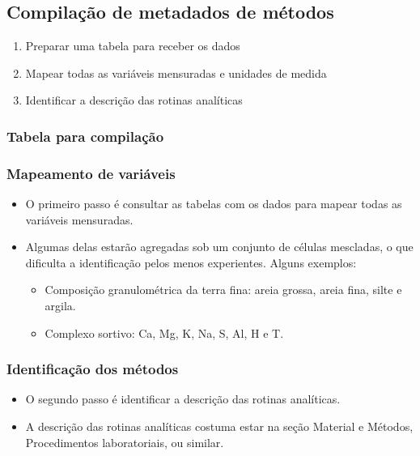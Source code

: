 \documentclass[a4paper,dvipsnames]{tufte-book}
\providecommand{\tightlist}{%
  \setlength{\itemsep}{0pt}\setlength{\parskip}{0pt}}
\begin{document}
\subsection{Compilação de metadados de
métodos}\label{compilauxe7uxe3o-de-metadados-de-muxe9todos}

\begin{enumerate}
\def\labelenumi{\arabic{enumi}.}
\tightlist
\item
  Preparar uma tabela para receber os dados
\item
  Mapear todas as variáveis mensuradas e unidades de medida
\item
  Identificar a descrição das rotinas analíticas
\end{enumerate}

\subsubsection{Tabela para
compilação}\label{tabela-para-compilauxe7uxe3o}

\subsubsection{Mapeamento de
variáveis}\label{mapeamento-de-variuxe1veis}

\begin{itemize}
\tightlist
\item
  O primeiro passo é consultar as tabelas com os dados para mapear todas
  as variáveis mensuradas.
\item
  Algumas delas estarão agregadas sob um conjunto de células mescladas,
  o que dificulta a identificação pelos menos experientes. Alguns
  exemplos:

  \begin{itemize}
  \tightlist
  \item
    Composição granulométrica da terra fina: areia grossa, areia fina,
    silte e argila.
  \item
    Complexo sortivo: Ca, Mg, K, Na, S, Al, H e T.
  \end{itemize}
\end{itemize}

\subsubsection{Identificação dos
métodos}\label{identificauxe7uxe3o-dos-muxe9todos}

\begin{itemize}
\tightlist
\item
  O segundo passo é identificar a descrição das rotinas analíticas.
\item
  A descrição das rotinas analíticas costuma estar na seção Material e
  Métodos, Procedimentos laboratoriais, ou similar.
\end{itemize}
\end{document}
